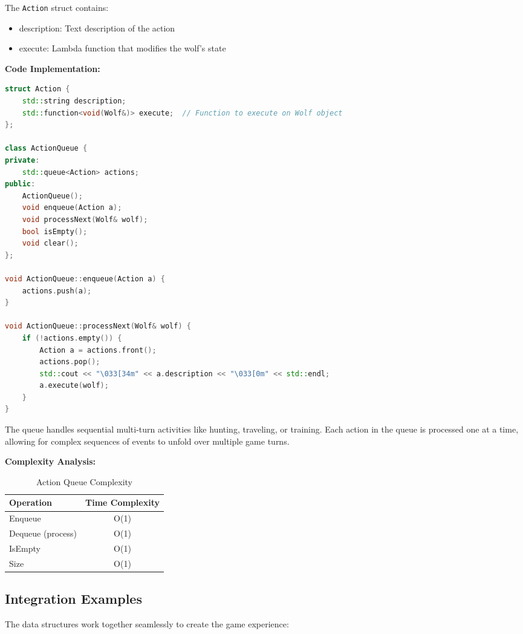 \documentclass[12pt,a4paper]{article}
\begin{document}
The \texttt{Action} struct contains:
\begin{itemize}
	\item description: Text description of the action
	\item execute: Lambda function that modifies the wolf's state
\end{itemize}

\textbf{Code Implementation:}
\begin{lstlisting}[language=C++, caption={Action Queue with FIFO Processing}]
struct Action {
    std::string description;
    std::function<void(Wolf&)> execute;  // Function to execute on Wolf object
};

class ActionQueue {
private:
    std::queue<Action> actions;
public:
    ActionQueue();
    void enqueue(Action a);
    void processNext(Wolf& wolf);
    bool isEmpty();
    void clear();
};

void ActionQueue::enqueue(Action a) {
    actions.push(a);
}

void ActionQueue::processNext(Wolf& wolf) {
    if (!actions.empty()) {
        Action a = actions.front();
        actions.pop();
        std::cout << "\033[34m" << a.description << "\033[0m" << std::endl;
        a.execute(wolf);
    }
}
\end{lstlisting}

The queue handles sequential multi-turn activities like hunting, traveling, or training. Each action in the queue is processed one at a time, allowing for complex sequences of events to unfold over multiple game turns.

\textbf{Complexity Analysis:}
\begin{table}[h]
	\centering
	\caption{Action Queue Complexity}
	\begin{tabular}{@{}lc@{}}
		\toprule
		\textbf{Operation} & \textbf{Time Complexity} \\ \midrule
		Enqueue            & O(1)                     \\
		Dequeue (process)  & O(1)                     \\
		IsEmpty            & O(1)                     \\
		Size               & O(1)                     \\
		\bottomrule
	\end{tabular}
\end{table}

\subsection{Integration Examples}
The data structures work together seamlessly to create the game experience:
\end{document}
